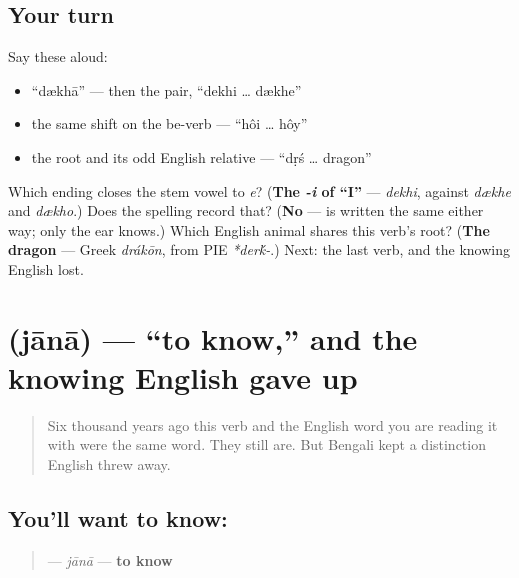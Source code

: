\subsection*{Your turn}
Say these aloud:

\begin{itemize}
\raggedright
  \item \textquotedblleft{}dækhā\textquotedblright{} — then the pair, \textquotedblleft{}dekhi … dækhe\textquotedblright{}
  \item the same shift on the be-verb — \textquotedblleft{}hôi … hôy\textquotedblright{}
  \item the root and its odd English relative — \textquotedblleft{}dṛś … dragon\textquotedblright{}
\end{itemize}

\begin{tcolorbox}[breakable,colback=teal!4,colframe=teal!35!black,title={Before you move on}]
Which ending closes the stem vowel to \emph{e}? (\textbf{The \emph{-i} of \textquotedblleft{}I\textquotedblright{}} — \emph{dekhi}, against \emph{dækhe} and \emph{dækho}.) Does the spelling record that? (\textbf{No} —  is written the same either way; only the ear knows.) Which English animal shares this verb's root? (\textbf{The dragon} — Greek \emph{drákōn}, from PIE \emph{*der\'{k}-}.) Next: the last verb, and the knowing English lost.
\end{tcolorbox}
\section[jānā]{ (jānā) — \textquotedblleft{}to know,\textquotedblright{} and the knowing English gave up}

\label{lesson:BN-C07-jana}



\begin{quote}
Six thousand years ago this verb and the English word you are reading it with were the same word. They still are. But Bengali kept a distinction English threw away.
\end{quote}

\subsection*{You'll want to know: }
\begin{quote}
\textbf{} — \emph{jānā} — \textbf{to know}
\end{quote}

